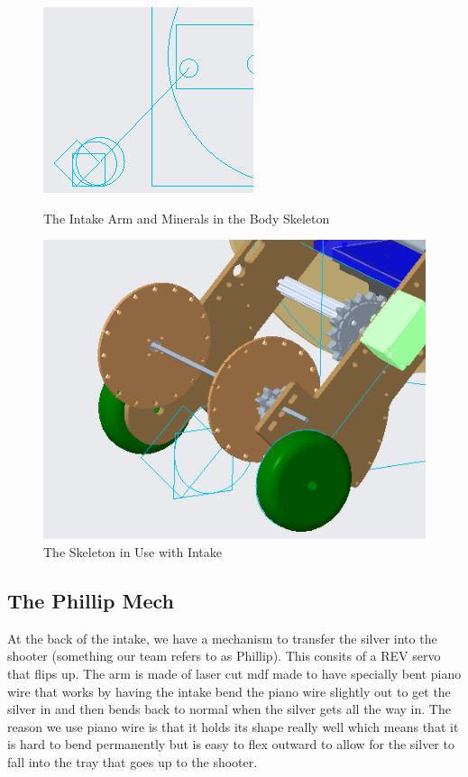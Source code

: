    \begin{figure}[ht!]
	\centering
	\begin{minipage}{.48\textwidth}
	  \centering
	  \includegraphics[width=0.8\linewidth]{Design_Overview/skel_intake.PNG}
	  \caption{The Intake Arm and Minerals in the Body Skeleton}
	  \label{fig:skel_intake}
	\end{minipage}%
	\begin{minipage}{.48\textwidth}
	  \centering
	  \includegraphics[width=0.8\linewidth]{Design_Overview/skel_intake_in_use.PNG}
	  \caption{The Skeleton in Use with Intake}
	  \label{fig:skel_intake_use}
	\end{minipage}
	\end{figure}

\subsection*{The Phillip Mech}
At the back of the intake, we have a mechanism to transfer the silver into the shooter (something our team refers to as Phillip). This consits of a REV servo that flips up. The arm is made of laser cut mdf made to have specially bent piano wire that works by having the intake bend the piano wire slightly out to get the silver in and then bends back to normal when the silver gets all the way in. The reason we use piano wire is that it holds its shape really well which means that it is hard to bend permanently but is easy to flex outward to allow for the silver to fall into the tray that goes up to the shooter.

